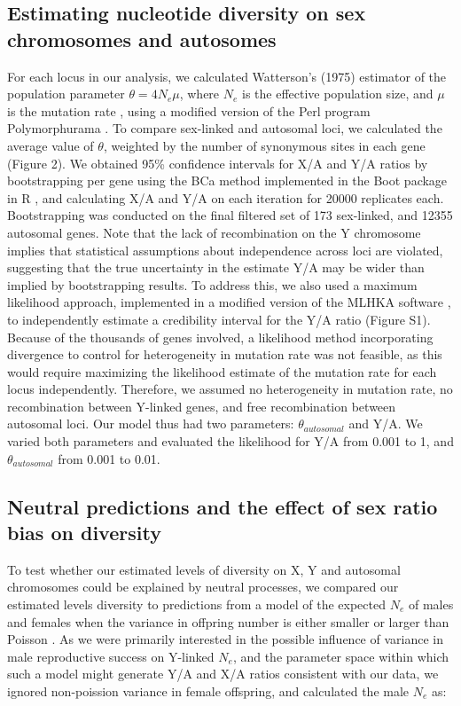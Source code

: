 \documentclass[9pt,twocolumn,twoside]{gsajnl}
\begin{document}
\subsection*{Estimating nucleotide diversity on sex chromosomes and autosomes}
For each locus in our analysis, we calculated Watterson’s (1975) estimator of the population parameter $\theta=4N_{e}\mu$, where $N_{e}$ is the effective population size, and $\mu$ is the mutation rate \citep{watterson1975}, using a modified version of the Perl program Polymorphurama \citep{bachtrog2006}. To compare sex-linked and autosomal loci, we calculated the average value of $\theta$, weighted by the number of synonymous sites in each gene (\X Figure 2). We obtained 95\% confidence intervals for X/A and Y/A ratios by bootstrapping per gene using the BCa method \citep{efron1994} implemented in the Boot package in R \citep{canty2012boot}, and calculating X/A and Y/A on each iteration for 20000 replicates each. Bootstrapping was conducted on the final filtered set of 173 sex-linked, and 12355 autosomal genes. Note that the lack of recombination on the Y chromosome implies that statistical assumptions about independence across loci are violated, suggesting that the true uncertainty in the estimate Y/A may be wider than implied by bootstrapping results. To address this, we also used a maximum likelihood approach, implemented in a modified version of the MLHKA software \citep{wright2004hka}, to independently estimate a credibility interval for the Y/A ratio (Figure S1). Because of the thousands of genes involved, a likelihood method incorporating divergence to control for heterogeneity in mutation rate was not feasible, as this would require maximizing the likelihood estimate of the mutation rate for each locus independently. Therefore, we assumed no heterogeneity in mutation rate, no recombination between Y-linked genes, and free recombination between autosomal loci. Our model thus had two parameters: $\theta_{autosomal}$ and Y/A. We varied both parameters and evaluated the likelihood for Y/A from 0.001 to 1, and $\theta_{autosomal}$ from 0.001 to 0.01.

\subsection*{Neutral predictions and the effect of sex ratio bias on diversity}
To test whether our estimated levels of diversity on X, Y and autosomal chromosomes could be explained by neutral processes, we compared our estimated levels diversity to predictions from a model of the expected $N_{e}$ of males and females when the variance in offpring number is either smaller or larger than Poisson \citep{kimura1964number, hedrick2011genetics}. As we were primarily interested in the possible influence of variance in male reproductive success on Y-linked $N_{e}$, and the parameter space within which such a model might generate Y/A and X/A ratios consistent with our data, we ignored non-poission variance in female offspring, and calculated the male $N_{e}$ as:
\end{document}
